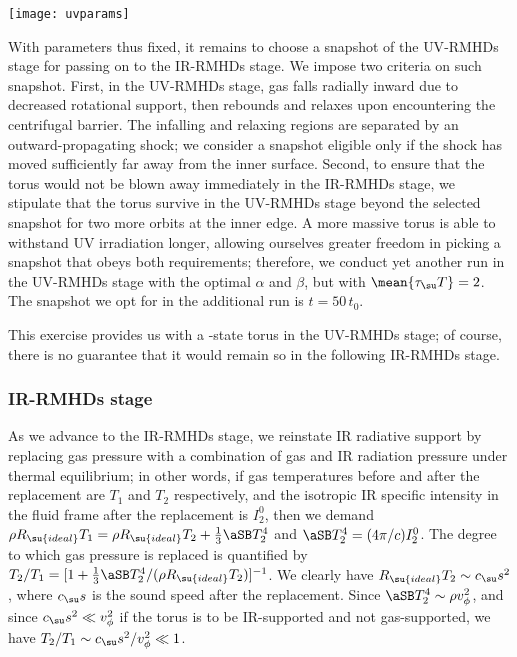\documentclass[twocolumn]{article}
\newcommand*\uvrmhd{\ac{UV}\protect\nobreakdash-\acp{RMHD}}
\newcommand*\irrmhd{\ac{IR}\protect\nobreakdash-\acp{RMHD}}
\newcommand*\titleirrmhd{\texorpdfstring
  {\acs*{IR}\protect\nobreakdash-\acsp*{RMHD}}{IR-RMHD}}
\begin{document}
\begin{figure*}
\texttt{[image: uvparams]}
\caption{\textit{Left panel:} Plot of pre-factor $\alpha$ and power-law
exponent $\beta$ that specify how $j(R)$ is modified just before the \uvrmhd{}
stage. Contours plot $b$, with solid contours at 0.6 to 0.9 from bottom-right
to top-left in steps of 0.1. \textit{Right panel:} Plot of lifetime, normalized
to fiducial units (\cref{tab:fiducial}), against $b$. See \cref{sec:angular
momentum} for the definitions of $j(R)$, $\alpha$, $\beta$, and $b$, and
\cref{sec:parameter study} for the definition of lifetime.}
\label{fig:UV-RMHD parameter study}
\end{figure*}

With parameters thus fixed, it remains to choose a snapshot of the \uvrmhd{}
stage for passing on to the \irrmhd{} stage. We impose two criteria on such
snapshot. First, in the \uvrmhd{} stage, gas falls radially inward due to
decreased rotational support, then rebounds and relaxes upon encountering the
centrifugal barrier. The infalling and relaxing regions are separated by an
outward-propagating shock; we consider a snapshot eligible only if the shock
has moved sufficiently far away from the inner surface. Second, to ensure that
the torus would not be blown away immediately in the \irrmhd{} stage, we
stipulate that the torus survive in the \uvrmhd{} stage beyond the selected
snapshot for two more orbits at the inner edge. A more massive torus is able to
withstand \ac{UV} irradiation longer, allowing ourselves greater freedom in
picking a snapshot that obeys both requirements; therefore, we conduct yet
another run in the \uvrmhd{} stage with the optimal $\alpha$ and $\beta$, but
with $\mean{\tau_\su T}=2$. The snapshot we opt for in the additional run is
$t=50\,t_0$.

This exercise provides us with a -state torus in the
\uvrmhd{} stage; of course, there is no guarantee that it would remain so in
the following \irrmhd{} stage.

\subsubsection{\titleirrmhd{} stage}
\label{sec:IR-RMHD stage}

As we advance to the \irrmhd{} stage, we reinstate \ac{IR} radiative support by
replacing gas pressure with a combination of gas and \ac{IR} radiation pressure
under thermal equilibrium; in other words, if gas temperatures before and after
the replacement are $T_1$ and $T_2$ respectively, and the isotropic \ac{IR}
specific intensity in the fluid frame after the replacement is $I^0_2$, then we
demand $\rho R_\su{ideal}T_1=\rho R_\su{ideal}T_2+\tfrac13\aSB T_2^4$ and $\aSB
T_2^4=(4\pi/c)I^0_2$. The degree to which gas pressure is replaced is
quantified by $T_2/T_1=[1+\tfrac13\aSB T_2^4/(\rho R_\su{ideal}T_2)]^{-1}$. We
clearly have $R_\su{ideal}T_2\sim c_\su s^2$, where $c_\su s$ is the sound
speed after the replacement. Since $\aSB T_2^4\sim\rho v_\phi^2$, and since
$c_\su s^2\ll v_\phi^2$ if the torus is to be \ac{IR}-supported and not
gas-supported, we have $T_2/T_1\sim c_\su s^2/v_\phi^2\ll1$.
\end{document}
